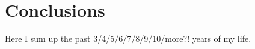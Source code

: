 





\chapter{Conclusions}
Here I sum up the past 3/4/5/6/7/8/9/10/more?! years of my life.









